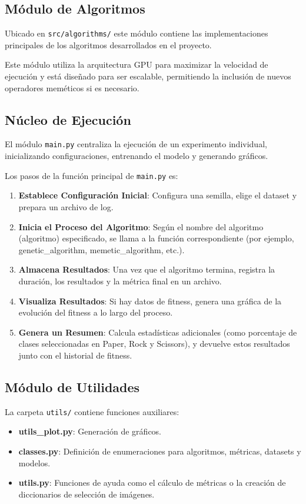 \subsection{Módulo de Algoritmos}\label{subsec:modulo-de-algoritmos}
Ubicado en \texttt{src/algorithms/} este módulo contiene las implementaciones principales de los
algoritmos desarrollados en el proyecto.

Este módulo utiliza la arquitectura GPU para maximizar la velocidad de ejecución y está diseñado para ser escalable,
permitiendo la inclusión de nuevos operadores meméticos si es necesario.

\subsection{Núcleo de Ejecución}\label{subsec:nucleo-de-ejecucion}
El módulo \texttt{main.py} centraliza la ejecución de un experimento individual, inicializando configuraciones,
entrenando el modelo y generando gráficos.

Los pasos de la función principal de \texttt{main.py} es:
\begin{enumerate}
      \item \textbf{Establece Configuración Inicial}: Configura una semilla, elige el dataset y prepara un archivo de log.
      \item \textbf{Inicia el Proceso del Algoritmo}: Según el nombre del algoritmo (algoritmo) especificado, se llama a
            la función correspondiente (por ejemplo, genetic\_algorithm, memetic\_algorithm, etc.).
      \item \textbf{Almacena Resultados}: Una vez que el algoritmo termina, registra la duración, los resultados y la
            métrica final en un archivo.
      \item \textbf{Visualiza Resultados}: Si hay datos de fitness, genera una gráfica de la evolución del fitness a lo
            largo del proceso.
      \item \textbf{Genera un Resumen}: Calcula estadísticas adicionales (como porcentaje de clases seleccionadas en
            Paper, Rock y Scissors), y devuelve estos resultados junto con el historial de fitness.
\end{enumerate}

\subsection{Módulo de Utilidades}\label{subsec:modulo-de-utilidades}
La carpeta \texttt{utils/} contiene funciones auxiliares:
\begin{itemize}
      \item \textbf{utils\_plot.py}: Generación de gráficos.
      \item \textbf{classes.py}: Definición de enumeraciones para algoritmos, métricas, datasets y modelos.
      \item \textbf{utils.py}: Funciones de ayuda como el cálculo de métricas o la creación de diccionarios de selección de imágenes.
\end{itemize}

